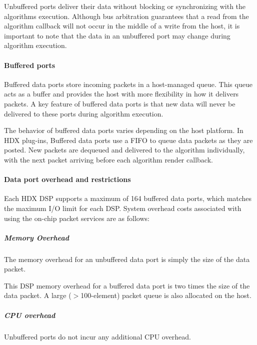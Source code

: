 Unbuffered ports deliver their data without blocking or synchronizing with the algorithm\textquotesingle{}s execution. Although bus arbitration guarantees that a read from the algorithm callback will not occur in the middle of a write from the host, it is important to note that the data in an unbuffered port may change during algorithm execution.

\hypertarget{a00362_subsubsection__buffered_ports_}{}\paragraph{Buffered ports}\label{a00362_subsubsection__buffered_ports_}
 Buffered data ports store incoming packets in a host-\/managed queue. This queue acts as a buffer and provides the host with more flexibility in how it delivers packets. A key feature of buffered data ports is that new data will never be delivered to these ports during algorithm execution.

The behavior of buffered data ports varies depending on the host platform. In H\+D\+X plug-\/ins, Buffered data ports use a F\+I\+F\+O to queue data packets as they are posted. New packets are dequeued and delivered to the algorithm individually, with the next packet arriving before each algorithm render callback.

\hypertarget{a00362_subsubsection__data_port_overhead_and_restrictions_}{}\paragraph{Data port overhead and restrictions}\label{a00362_subsubsection__data_port_overhead_and_restrictions_}
 Each H\+D\+X D\+S\+P supports a maximum of 164 buffered data ports, which matches the maximum I/\+O limit for each D\+S\+P. System overhead costs associated with using the on-\/chip packet services are as follows\+: \subparagraph*{Memory Overhead}

 
\begin{DoxyItemize}
\item The memory overhead for an unbuffered data port is simply the size of the data packet.  
\item This D\+S\+P memory overhead for a buffered data port is two times the size of the data packet. A large ($>$100-\/element) packet queue is also allocated on the host.  
\end{DoxyItemize}\subparagraph*{C\+P\+U overhead}

 Unbuffered ports do not incur any additional C\+P\+U overhead.

